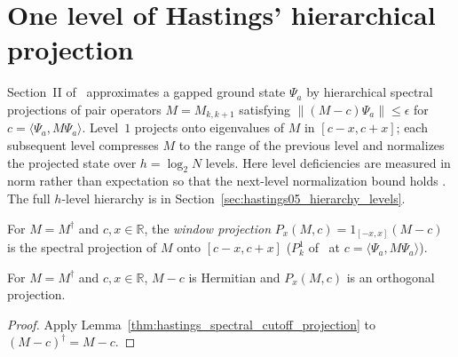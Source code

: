 \section{One level of Hastings' hierarchical projection}
\label{sec:hastings05_hierarchical_projection}


Section~II of~\cite{Hastings2006Solving} approximates a gapped ground state
$\Psi_a$ by hierarchical spectral projections of pair operators $M=M_{k,k+1}$
satisfying $\lVert(M-c)\Psi_a\rVert\le\epsilon$ for
$c=\langle\Psi_a,M\Psi_a\rangle$. Level~$1$ projects onto eigenvalues of $M$ in
$[c-x,c+x]$; each subsequent level compresses $M$ to the range of the previous
level and normalizes the projected state over $h=\log_2N$ levels. Here level
deficiencies are measured in norm rather than expectation so that the
next-level normalization bound holds
\cite{gap:hastings05_hierarchical_projection}. The full $h$-level hierarchy is
in Section~\ref{sec:hastings05_hierarchy_levels}.

\begin{definition}
    \label{def:hastings05_window_projection}
    \leanok
    For $M=M^\dagger$ and $c,x\in\mathbb R$, the \emph{window projection}
    $P_x(M,c)=1_{[-x,x]}(M-c)$ is the spectral projection of $M$ onto
    $[c-x,c+x]$ ($P^1_k$ of~\cite[lines 640--642]{Hastings2006Solving} at
    $c=\langle\Psi_a,M\Psi_a\rangle$).
\end{definition}

\begin{lemma}
    \label{thm:hastings05_shifted_hermitian}
    \leanok
    For $M=M^\dagger$ and $c,x\in\mathbb R$, $M-c$ is Hermitian and $P_x(M,c)$
    is an orthogonal projection.
\end{lemma}
\begin{proof}\leanok
    Apply Lemma~\ref{thm:hastings_spectral_cutoff_projection} to
    $(M-c)^\dagger=M-c$.
\end{proof}

